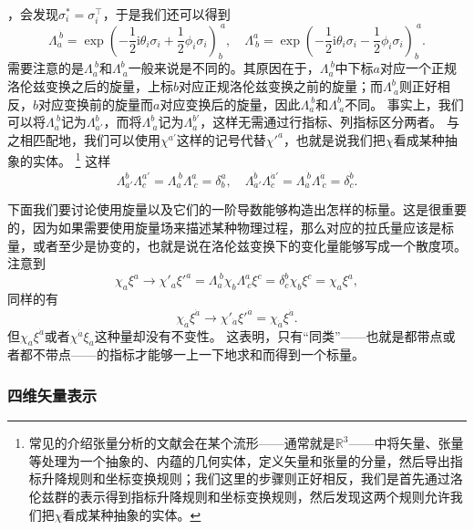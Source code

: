 \documentclass[hyperref, UTF8, a4paper]{ctexart}
\newcommand*{\ii}{\mathrm{i}}
\newcommand*{\reals}{\mathbb{R}}
\begin{document}
，会发现$\sigma_i^* = \sigma_i^\top$，于是我们还可以得到
\begin{equation}
    \Lambda_{\dot{a}}^{\ \dot{b}} = \exp \left( - \frac{1}{2} \ii \theta_i \sigma_i + \frac{1}{2} \phi_i \sigma_i \right)_b^{\ a}, \quad \Lambda^a_{\ b} = \exp \left( - \frac{1}{2} \ii \theta_i \sigma_i - \frac{1}{2} \phi_i \sigma_i \right)_b^{\ a}.
\end{equation}
需要注意的是$\Lambda_a^{\ b}$和$\Lambda^b_{\ a}$一般来说是不同的。其原因在于，$\Lambda_a^{\ b}$中下标$a$对应一个正规洛伦兹变换之后的旋量，上标$b$对应正规洛伦兹变换之前的旋量；而$\Lambda_{\ a}^b$则正好相反，$b$对应变换前的旋量而$a$对应变换后的旋量，因此$\Lambda_a^{\ b}$和$\Lambda^b_{\ a}$不同。
事实上，我们可以将$\Lambda_a^{\ b}$记为$\Lambda_{a'}^b$，而将$\Lambda^b_{\ a}$记为$\Lambda_a^{b'}$，这样无需通过行指标、列指标区分两者。
与之相匹配地，我们可以使用$\chi^{a'}$这样的记号代替${\chi'}^{a}$，也就是说我们把$\chi$看成某种抽象的实体。%
\footnote{常见的介绍张量分析的文献会在某个流形——通常就是$\reals^3$——中将矢量、张量等处理为一个抽象的、内蕴的几何实体，定义矢量和张量的分量，然后导出指标升降规则和坐标变换规则；我们这里的步骤则正好相反，我们是首先通过洛伦兹群的表示得到指标升降规则和坐标变换规则，然后发现这两个规则允许我们把$\chi$看成某种抽象的实体。}
这样
\begin{equation}
    \Lambda_{a'}^b \Lambda^{a'}_c = \Lambda_a^{\ b} \Lambda^a_{\ c} = \delta_b^a, \quad \Lambda_{\dot{a}'}^{\dot{b}} \Lambda^{\dot{a}'}_{\dot{c}} = \Lambda_{\dot{a}}^{\ \dot{b}} \Lambda^{\dot{a}}_{\ \dot{c}} = \delta_{\dot{c}}^{\dot{b}}.
\end{equation}

下面我们要讨论使用旋量以及它们的一阶导数能够构造出怎样的标量。这是很重要的，因为如果需要使用旋量场来描述某种物理过程，那么对应的拉氏量应该是标量，或者至少是协变的，也就是说在洛伦兹变换下的变化量能够写成一个散度项。
注意到
\[
    \chi_a \xi^a \longrightarrow \chi'_a {\xi'}^a = \Lambda_a^{\ b} \chi_b \Lambda^a_{\ c} \xi^c = \delta_c^b \chi_b \xi^c = \chi_a \xi^a,
\]
同样的有
\[
    \chi_{\dot{a}} \xi^{\dot{a}} \longrightarrow \chi'_{\dot{a}} {\xi'}^{\dot{a}} = \chi_{\dot{a}} \xi^{\dot{a}}.
\]
但$\chi_a \xi^{\dot{a}}$或者$\chi^{\dot{a}} \xi_a$这种量却没有不变性。
这表明，只有“同类”——也就是都带点或者都不带点——的指标才能够一上一下地求和而得到一个标量。

\subsubsection{四维矢量表示}\label{sec:4-vector-representation}
\end{document}
